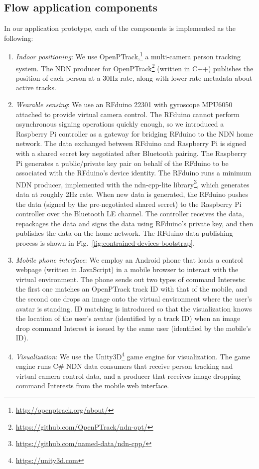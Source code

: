 \subsection{Flow application components}

In our application prototype, each of the components is implemented as the following:
\begin{enumerate}
\item \textit{Indoor positioning}: We use OpenPTrack,\footnote{\url{http://openptrack.org/about/}} a multi-camera person tracking system.
The NDN producer for OpenPTrack\footnote{\url{https://github.com/OpenPTrack/ndn-opt/}} (written in C++)  publishes the position of each person at a 30Hz rate, along with lower rate metadata about active tracks. 
\item \textit{Wearable sensing}: We use an RFduino 22301 with gyroscope MPU6050 attached to provide virtual camera control. 
The RFduino cannot perform asynchronous signing operations quickly enough, so we introduced a Raspberry Pi controller as a gateway for bridging RFduino to the NDN home network.
The data exchanged between RFduino and Raspberry Pi is signed with a shared secret key negotiated after Bluetooth pairing.
The Raspberry Pi generates a public/private key pair on behalf of the RFduino to be associated with the RFduino's device identity.
The RFduino runs a minimum NDN producer, implemented with the ndn-cpp-lite library\footnote{\url{https://github.com/named-data/ndn-cpp/}}, which generates data at roughly 2Hz rate.
When new data is generated, the RFduino pushes the data (signed by the pre-negotiated shared secret) to the Raspberry Pi controller over the Bluetooth LE channel.
The controller receives the data, repackages the data and signs the data using RFduino's private key, and then publishes the data on the home network.
The RFduino data publishing process is shown in Fig.~\ref{fig:contrained-devices-bootstrap}.
\item \textit{Mobile phone interface}: We employ an Android phone that loads a control webpage (written in JavaScript) in a mobile browser to interact with the virtual environment. 
The phone sends out two types of command Interests: the first one matches an OpenPTrack track ID with that of the mobile, and the second one drops an image onto the virtual environment where the user's avatar is standing. ID matching is introduced so that the visualization knows the location of the user's avatar (identified by a track ID) when an image drop command Interest is issued by the same user (identified by the mobile's ID).
\item \textit{Visualization}: We use the Unity3D\footnote{\url{https://unity3d.com}} game engine for visualization.
The game engine runs C\# NDN data consumers that receive person tracking and virtual camera control data, and a producer that receives image dropping command Interests from the mobile web interface.
\end{enumerate}


